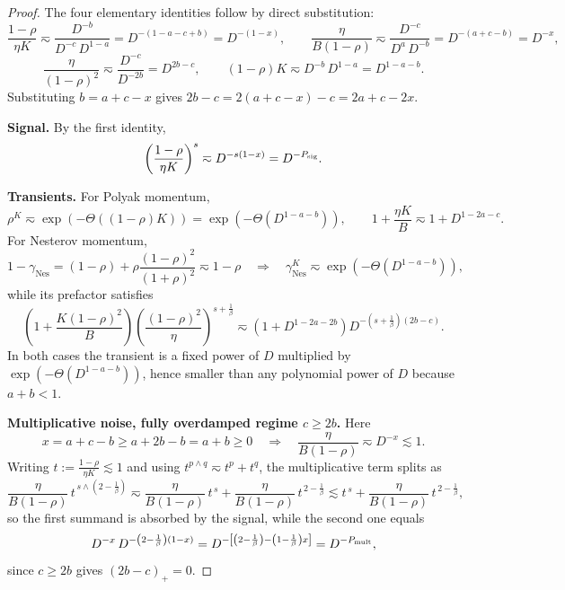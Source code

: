 \begin{proof}
The four elementary identities follow by direct substitution:
\[
    \frac{1-\rho}{\eta K}
    \eqsim
    \frac{D^{-b}}{D^{-c}\,D^{1-a}}
    =
    D^{-(1-a-c+b)}
    =
    D^{-(1-x)},
    \qquad
    \frac{\eta}{B(1-\rho)}
    \eqsim
    \frac{D^{-c}}{D^{a}\,D^{-b}}
    =
    D^{-(a+c-b)}
    =
    D^{-x},
\]
\[
    \frac{\eta}{(1-\rho)^{2}}
    \eqsim
    \frac{D^{-c}}{D^{-2b}}
    =
    D^{2b-c},
    \qquad
    (1-\rho)K
    \eqsim
    D^{-b}\,D^{1-a}
    =
    D^{1-a-b}.
\]
Substituting \(b=a+c-x\) gives \(2b-c=2(a+c-x)-c=2a+c-2x\).

\textbf{Signal.} By the first identity,
\[
    \left(\frac{1-\rho}{\eta K}\right)^{s}
    \eqsim
    D^{-s(1-x)}
    =
    D^{-P_{\rm sig}}.
\]

\textbf{Transients.} For Polyak momentum,
\[
    \rho^{K}
    \eqsim
    \exp\left(-\Theta\left((1-\rho)K\right)\right)
    =
    \exp\left(-\Theta\left(D^{1-a-b}\right)\right),
    \qquad
    1+\frac{\eta K}{B}\eqsim1+D^{1-2a-c}.
\]
For Nesterov momentum,
\[
    1-\gamma_{\mathrm{Nes}}
    =
    (1-\rho)+\rho\frac{(1-\rho)^{2}}{(1+\rho)^{2}}
    \eqsim
    1-\rho
    \quad\Longrightarrow\quad
    \gamma_{\mathrm{Nes}}^{K}
    \eqsim
    \exp\left(-\Theta\left(D^{1-a-b}\right)\right),
\]
while its prefactor satisfies
\[
    \left(1+\frac{K(1-\rho)^{2}}{B}\right)
    \left(\frac{(1-\rho)^{2}}{\eta}\right)^{s+\frac1\beta}
    \eqsim
    \left(1+D^{1-2a-2b}\right)D^{-\left(s+\frac1\beta\right)(2b-c)}.
\]
In both cases the transient is a fixed power of \(D\) multiplied by \(\exp\left(-\Theta\left(D^{1-a-b}\right)\right)\), hence smaller than any polynomial power of \(D\) because \(a+b<1\).

\textbf{Multiplicative noise, fully overdamped regime \(c\geq2b\).} Here
\[
    x=a+c-b\geq a+2b-b=a+b\geq0
    \quad\Longrightarrow\quad
    \frac{\eta}{B(1-\rho)}\eqsim D^{-x}\lesssim1.
\]
Writing \(t:=\frac{1-\rho}{\eta K}\lesssim1\) and using \(t^{p\wedge q}\eqsim t^{p}+t^{q}\), the multiplicative term splits as
\[
    \frac{\eta}{B(1-\rho)}\,t^{\,s\wedge\left(2-\frac1\beta\right)}
    \eqsim
    \frac{\eta}{B(1-\rho)}\,t^{\,s}
    +
    \frac{\eta}{B(1-\rho)}\,t^{\,2-\frac1\beta}
    \lesssim
    t^{\,s}
    +
    \frac{\eta}{B(1-\rho)}\,t^{\,2-\frac1\beta},
\]
so the first summand is absorbed by the signal, while the second one equals
\[
    D^{-x}\,D^{-\left(2-\frac1\beta\right)(1-x)}
    =
    D^{-\left[\left(2-\frac1\beta\right)-\left(1-\frac1\beta\right)x\right]}
    =
    D^{-P_{\rm mult}},
\]
since \(c\geq2b\) gives \(\left(2b-c\right)_{+}=0\).


\end{proof}
